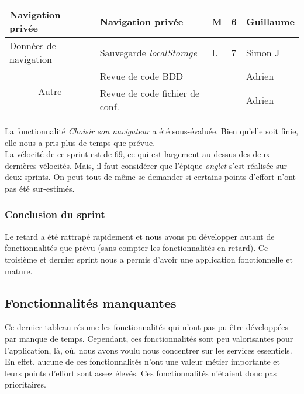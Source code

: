 \documentclass[10pt,a4paper]{article}
\begin{document}
\begin{table}[h]
\begin{tabular}{|c|l|l|l|l|}
\multicolumn{1}{|l|}{Navigation privée}     & Navigation privée                                                                           & M                                            & 6                                           & Guillaume          \\ \hline
\multicolumn{1}{|l|}{Données de navigation} & Sauvegarde \textit{localStorage}                                                                     & L                                            & 7                                           & Simon J            \\ \hline
\multirow{2}{*}{Autre}                      & Revue de code BDD                                                                           &                                              &                                             & Adrien             \\ \cline{2-5} 
                                            & Revue de code fichier de conf.                                                              &                                              &                                             & Adrien             \\ \hline
\end{tabular}
\end{table}

La fonctionnalité \textit{Choisir son navigateur} a été sous-évaluée. Bien qu'elle soit finie, elle nous a pris plus de temps que prévue. \\

La vélocité de ce sprint est de 69, ce qui est largement au-dessus des deux dernières vélocités. Mais, il faut considérer que l'épique \textit{onglet} s'est réalisée sur deux sprints. On peut tout de même se demander si certains points d'effort n'ont pas été sur-estimés.

\subsubsection{Conclusion du sprint}

 Le retard a été rattrapé rapidement et nous avons pu développer autant de fonctionnalités que prévu (sans compter les fonctionnalités en retard). 
 Ce troisième et dernier sprint nous a permis d'avoir une application fonctionnelle et mature.

\subsection{Fonctionnalités manquantes}
Ce dernier tableau résume les fonctionnalités qui n'ont pas pu être développées par manque de temps. Cependant, ces fonctionnalités sont peu valorisantes pour l'application, là, où, nous avons voulu nous concentrer sur les services essentiels. En effet, aucune de ces fonctionnalités n'ont une valeur métier importante et leurs points d'effort sont assez élevés. Ces fonctionnalités n'étaient donc pas prioritaires.
\end{document}
